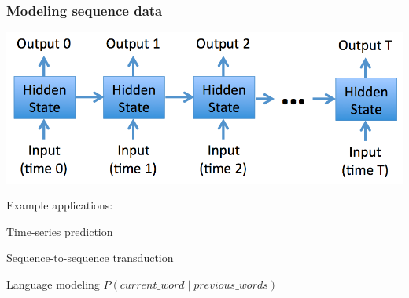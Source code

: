\begin{frame}
\frametitle{Modeling sequence data}
\centerline{\includegraphics[scale=0.3]{figs/sequencemodel}}
\bi
\pause
\item Example applications:
  
	\bi 
        \item Time-series prediction
        \item Sequence-to-sequence transduction
	\item Language modeling $P(current\_word \mid previous\_words)$
	\ei
\ei
\end{frame}


